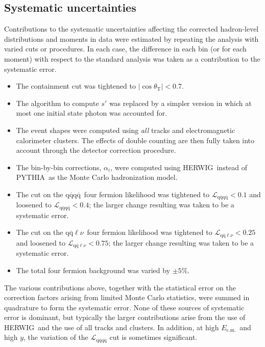 \documentclass[12pt,a4paper,twoside]{article}
\newcommand{\qqbar}  {\ensuremath{\mathrm{q\overline{q}}}}
\newcommand{\lnu}    {\ensuremath{\ell\nu}}
\newcommand{\ecm}   {\ensuremath{E_{\mathrm{c.m.}}}}
\newcommand{\Herwig}{\mbox{HERWIG}}
\newcommand{\Pythia}{\mbox{PYTHIA}}
\begin{document}
%
%
%
\subsection{ Systematic uncertainties }
\label{sec_syserr}

Contributions to the systematic uncertainties 
affecting the corrected hadron-level 
distributions and moments in data were 
estimated by repeating the analysis with varied cuts or procedures.
In each case, the difference in each bin (or for each moment) with respect 
to the standard analysis was taken as a contribution to the systematic error.
\begin{itemize}
\item The containment cut was tightened to $|\cos\theta_{\mathrm{T}}|<0.7$.
\item The algorithm to compute $s'$ was replaced by a simpler version 
in which at most one initial state photon was accounted for.
\item The event shapes were computed using {\it all} tracks and 
electromagnetic calorimeter clusters.
The effects of double counting are then fully 
taken into account through the detector correction procedure.
\item The bin-by-bin corrections, $\alpha_i$, 
were computed using \Herwig\ instead of
\Pythia\ as the Monte Carlo hadronization model.
\item The cut on the \qqbar\qqbar\ four fermion likelihood
was tightened to $\mathcal{L}_{\qqbar\qqbar}<0.1$ and loosened to
$\mathcal{L}_{\qqbar\qqbar}<0.4$; the larger change resulting
was taken to be a systematic error.   
\item The cut on the \qqbar\lnu\ four fermion likelihood
was tightened to $\mathcal{L}_{\qqbar\lnu}<0.25$ and loosened to
$\mathcal{L}_{\qqbar\lnu}<0.75$; the larger change resulting
was taken to be a systematic error.   
\item The total four fermion background was varied by $\pm5\%$. 
\end{itemize}
The various contributions above, together with the
statistical error on the correction factors arising from limited Monte Carlo
statistics, were summed in quadrature to form the systematic error.
None of these sources of systematic error is dominant, but typically
the larger contributions arise from the use of \Herwig\ and the
use of all tracks and clusters.  In addition, at high \ecm\ and high $y$, 
the variation of the  $\mathcal{L}_{\qqbar\qqbar}$ cut is sometimes 
significant.
\end{document}
